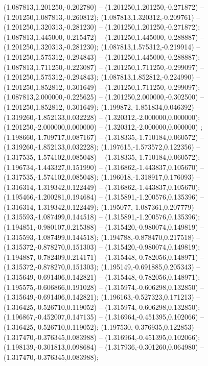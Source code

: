  (1.087813,1.201250,-0.202780) -- (1.201250,1.201250,-0.271872) -- (1.201250,1.087813,-0.260812);
 (1.087813,1.320312,-0.209761) -- (1.201250,1.320313,-0.281230) -- (1.201250,1.201250,-0.271872);
 (1.087813,1.445000,-0.215472) -- (1.201250,1.445000,-0.288887) -- (1.201250,1.320313,-0.281230);
 (1.087813,1.575312,-0.219914) -- (1.201250,1.575312,-0.294843) -- (1.201250,1.445000,-0.288887);
 (1.087813,1.711250,-0.223087) -- (1.201250,1.711250,-0.299097) -- (1.201250,1.575312,-0.294843);
 (1.087813,1.852812,-0.224990) -- (1.201250,1.852812,-0.301649) -- (1.201250,1.711250,-0.299097);
 (1.087813,2.000000,-0.225625) -- (1.201250,2.000000,-0.302500) -- (1.201250,1.852812,-0.301649);
 (1.199872,-1.851834,0.046392) -- (1.319260,-1.852133,0.032228) -- (1.320312,-2.000000,0.000000);
 (1.201250,-2.000000,0.000000) -- (1.320312,-2.000000,0.000000) ;
 (1.198660,-1.709717,0.087167) -- (1.318335,-1.710184,0.060572) -- (1.319260,-1.852133,0.032228);
 (1.197615,-1.573572,0.122356) -- (1.317535,-1.574102,0.085048) -- (1.318335,-1.710184,0.060572);
 (1.196734,-1.443327,0.151990) -- (1.316862,-1.443837,0.105670) -- (1.317535,-1.574102,0.085048);
 (1.196018,-1.318917,0.176093) -- (1.316314,-1.319342,0.122449) -- (1.316862,-1.443837,0.105670);
 (1.195466,-1.200281,0.194684) -- (1.315891,-1.200576,0.135396) -- (1.316314,-1.319342,0.122449);
 (1.195077,-1.087361,0.207779) -- (1.315593,-1.087499,0.144518) -- (1.315891,-1.200576,0.135396);
 (1.194851,-0.980107,0.215388) -- (1.315420,-0.980074,0.149819) -- (1.315593,-1.087499,0.144518);
 (1.194788,-0.878470,0.217518) -- (1.315372,-0.878270,0.151303) -- (1.315420,-0.980074,0.149819);
 (1.194887,-0.782409,0.214171) -- (1.315448,-0.782056,0.148971) -- (1.315372,-0.878270,0.151303);
 (1.195149,-0.691885,0.205343) -- (1.315649,-0.691406,0.142821) -- (1.315448,-0.782056,0.148971);
 (1.195575,-0.606866,0.191028) -- (1.315974,-0.606298,0.132850) -- (1.315649,-0.691406,0.142821);
 (1.196163,-0.527323,0.171213) -- (1.316425,-0.526710,0.119052) -- (1.315974,-0.606298,0.132850);
 (1.196867,-0.452007,0.147135) -- (1.316964,-0.451395,0.102066) -- (1.316425,-0.526710,0.119052);
 (1.197530,-0.376935,0.122853) -- (1.317470,-0.376345,0.083988) -- (1.316964,-0.451395,0.102066);
 (1.198139,-0.301813,0.098684) -- (1.317936,-0.301260,0.064980) -- (1.317470,-0.376345,0.083988);
